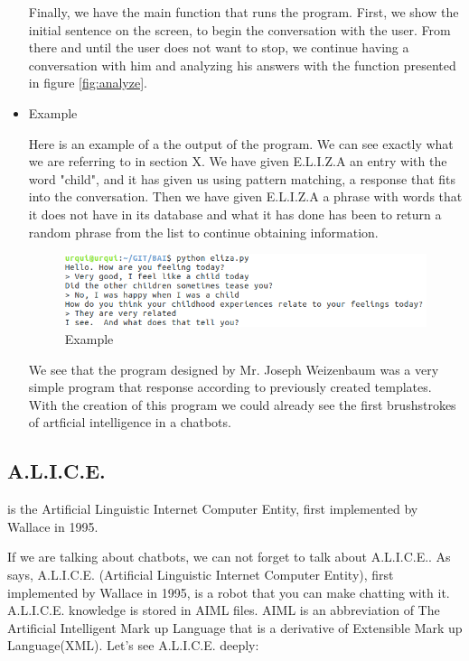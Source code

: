 \documentclass[12pt,twoside]{article}
\theoremstyle{plain}
\theoremstyle{definition}
\theoremstyle{remark}
\begin{document}
\begin{itemize}
\begin{figure}[h]
\end{figure}
Finally, we have the main function that runs the program. First, we show the initial sentence on the screen, to begin the conversation with the user. From there and until the user does not want to stop, we continue having a conversation with him and analyzing his answers with the function presented in figure \ref{fig:analyze}.\\


\item{Example}
	
Here is an example of a the output of the program. We can see exactly what we are referring to in section X. We have given E.L.I.Z.A an entry with the word "child", and it has given us using pattern matching, a response that fits into the conversation. Then we have given E.L.I.Z.A a phrase with words that it does not have in its database and what it has done has been to return a random phrase from the list to continue obtaining information.

\begin{figure}[h]
\centering
\includegraphics[scale=0.6]{./Pictures/example.png}
\caption{Example}
\end{figure}

We see that the program designed by Mr. Joseph Weizenbaum was a very simple program that response according to previously created templates. With the creation of this program we could already see the first brushstrokes of artficial intelligence in a chatbots.
 
\end{itemize}
		
\subsection{A.L.I.C.E.}
	\label{sec:A.L.I.C.E.}
	is
the Artificial Linguistic Internet Computer Entity, first implemented by Wallace
in 1995. 
	
	If we are talking about chatbots, we can not forget to talk about A.L.I.C.E.. As \cite{shawar2002comparison} says, A.L.I.C.E. (Artificial Linguistic Internet Computer Entity), first implemented by Wallace in 1995,  is a robot that you can make chatting with it. A.L.I.C.E. knowledge is stored in AIML files. AIML is an abbreviation of The Artificial Intelligent Mark up Language that is a derivative of Extensible Mark up Language(XML). Let's see A.L.I.C.E. deeply:
\end{document}
